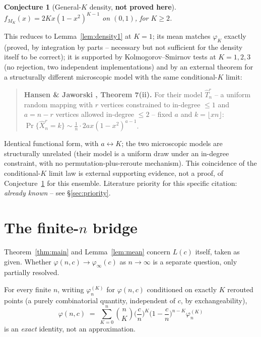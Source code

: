 \documentclass[11pt]{article}
\newtheorem{conjecture}{Conjecture}
\theoremstyle{remark}
\newcommand{\phiinf}{\varphi_\infty}
\begin{document}
\begin{conjecture}[General-$K$ density, \textbf{not proved here}]
\label{conj:densityK}
$f_{M_K}(x) = 2Kx(1-x^2)^{K-1}$ on $(0,1)$, for $K\ge2$.
\end{conjecture}

This reduces to Lemma~\ref{lem:density1} at $K=1$; its mean matches
$\varphi_K$ exactly (proved, by integration by parts -- necessary but
not sufficient for the density itself to be correct); it is supported by
Kolmogorov--Smirnov tests at $K=1,2,3$ (no rejection, two independent
implementations) and by an external theorem for a structurally different
microscopic model with the same conditional-$K$ limit:

\begin{quote}
\textbf{Hansen \& Jaworski \cite{hansenjaworski2014}, Theorem 7(ii).} For
their model $\hat T^r_n$ -- a uniform random mapping with $r$ vertices
constrained to in-degree $\le1$ and $a=n-r$ vertices allowed in-degree
$\le2$ -- fixed $a$ and $k=\lfloor xn\rfloor$:
$\Pr\{\hat X^r_n=k\} \sim \tfrac1n\cdot 2ax(1-x^2)^{a-1}$.
\end{quote}

Identical functional form, with $a\leftrightarrow K$; the two
microscopic models are structurally unrelated (their model is a uniform
draw under an in-degree constraint, with no permutation-plus-reroute
mechanism). This coincidence of the conditional-$K$ limit law is
external supporting evidence, not a proof, of Conjecture~\ref{conj:densityK}
for this ensemble. Literature priority for this specific citation:
\emph{already known} -- see \S\ref{sec:priority}.

\section{The finite-$n$ bridge}
\label{sec:bridge}

Theorem~\ref{thm:main} and Lemma~\ref{lem:mean} concern $L(c)$ itself,
taken as given. Whether $\varphi(n,c)\to\phiinf(c)$ as $n\to\infty$ is a
separate question, only partially resolved.

For every finite $n$, writing $\varphi_n^{(K)}$ for $\varphi(n,c)$
conditioned on exactly $K$ rerouted points (a purely combinatorial
quantity, independent of $c$, by exchangeability),
\begin{equation}
\label{eq:mixture}
  \varphi(n,c) \;=\; \sum_{K=0}^n \binom{n}{K}\Big(\frac cn\Big)^{\!K}\Big(1-\frac cn\Big)^{\!n-K}\varphi_n^{(K)}
\end{equation}
is an \emph{exact} identity, not an approximation.
\end{document}
